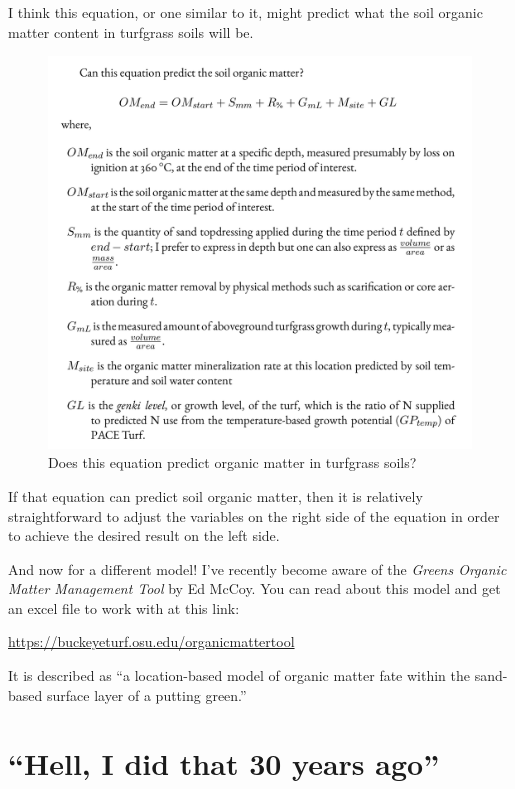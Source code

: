 \documentclass[12pt,b5,]{tufte-book}
\begin{document}
I think this equation, or one similar to it, might predict what the soil organic matter content in turfgrass soils will be.

\begin{figure}
\centering
\includegraphics{img/om_prediction_equation.png}
\caption{Does this equation predict organic matter in turfgrass soils?}
\end{figure}

If that equation can predict soil organic matter, then it is relatively straightforward to adjust the variables on the right side of the equation in order to achieve the desired result on the left side.

And now for a different model! I've recently become aware of the \emph{Greens Organic Matter Management Tool} by Ed McCoy. You can read about this model and get an excel file to work with at this link:

\url{https://buckeyeturf.osu.edu/organicmattertool}

It is described as ``a location-based model of organic matter fate within the sand-based surface layer of a putting green.''

\hypertarget{hell-i-did-that-30-years-ago}{%
\chapter{``Hell, I did that 30 years ago''}\label{hell-i-did-that-30-years-ago}}
\end{document}
